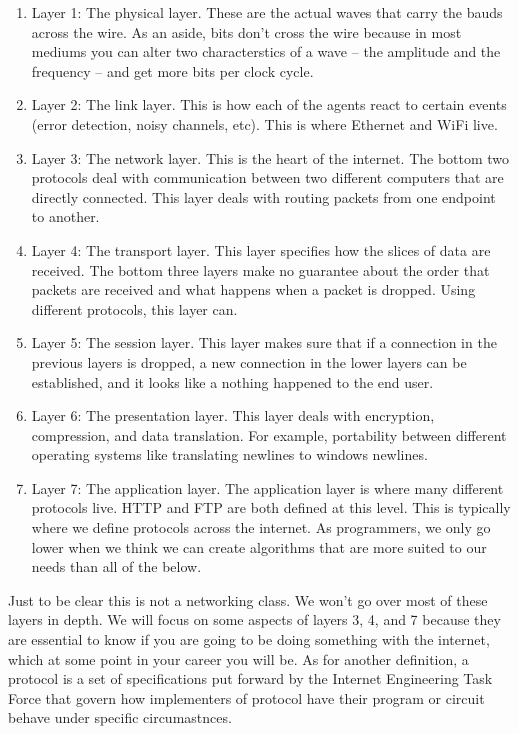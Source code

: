 \begin{enumerate}
\item Layer 1: The physical layer.
  These are the actual waves that carry the bauds across the wire.
  As an aside, bits don't cross the wire because in most mediums you can alter two characterstics of a wave -- the amplitude and the frequency -- and get more bits per clock cycle.

\item Layer 2: The link layer.
  This is how each of the agents react to certain events (error detection, noisy channels, etc).
  This is where \gls{Ethernet} and \gls{WiFi} live.

\item Layer 3: The network layer.
  This is the heart of the internet.
  The bottom two protocols deal with communication between two different computers that are directly connected.
  This layer deals with routing packets from one endpoint to another.

\item Layer 4: The transport layer.
  This layer specifies how the slices of data are received.
  The bottom three layers make no guarantee about the order that packets are received and what happens when a packet is dropped.
  Using different protocols, this layer can.

\item Layer 5: The session layer.
  This layer makes sure that if a connection in the previous layers is dropped, a new connection in the lower layers can be established, and it looks like a nothing happened to the end user.

\item Layer 6: The presentation layer.
  This layer deals with encryption, compression, and data translation.
  For example, portability between different operating systems like translating newlines to windows newlines.

\item Layer 7: The application layer.
  The application layer is where many different protocols live.
  \gls{HTTP} and \gls{FTP} are both defined at this level.
  This is typically where we define protocols across the internet.
  As programmers, we only go lower when we think we can create algorithms that are more suited to our needs than all of the below.

\end{enumerate}

Just to be clear this is not a networking class.
We won't go over most of these layers in depth.
We will focus on some aspects of layers 3, 4, and 7 because they are essential to know if you are going to be doing something with the internet, which at some point in your career you will be.
As for another definition, a protocol is a set of specifications put forward by the \gls{Internet Engineering Task Force} that govern how implementers of protocol have their program or circuit behave under specific circumastnces.


